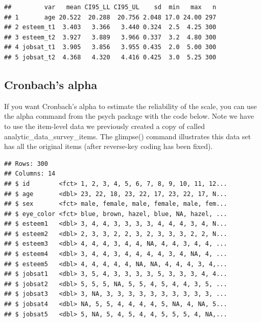 \documentclass[
]{krantz}
\makeatletter
\newenvironment{Shaded}{\begin{snugshade}}{\end{snugshade}}
\newcommand{\KeywordTok}[1]{\textcolor[rgb]{0.27,0.27,0.27}{\textbf{#1}}}
\newcommand{\NormalTok}[1]{#1}
\newcommand{\OperatorTok}[1]{\textcolor[rgb]{0.43,0.43,0.43}{\textbf{#1}}}
\newcommand{\StringTok}[1]{\textcolor[rgb]{0.5,0.5,0.5}{#1}}
\newenvironment{kframe}{%
\medskip{}
\setlength{\fboxsep}{.8em}
 \def\at@end@of@kframe{}%
 \ifinner\ifhmode%
  \def\at@end@of@kframe{\end{minipage}}%
  \begin{minipage}{\columnwidth}%
 \fi\fi%
 \def\FrameCommand##1{\hskip\@totalleftmargin \hskip-\fboxsep
 \colorbox{shadecolor}{##1}\hskip-\fboxsep
     \hskip-\linewidth \hskip-\@totalleftmargin \hskip\columnwidth}%
 \MakeFramed {\advance\hsize-\width
   \@totalleftmargin\z@ \linewidth\hsize
   \@setminipage}}%
 {\par\unskip\endMakeFramed%
 \at@end@of@kframe}
\renewenvironment{Shaded}{\begin{kframe}}{\end{kframe}}
\makeatother
\begin{document}
\begin{verbatim}
##         var   mean CI95_LL CI95_UL    sd  min   max   n
## 1       age 20.522  20.288  20.756 2.048 17.0 24.00 297
## 2 esteem_t1  3.403   3.366   3.440 0.324  2.5  4.25 300
## 3 esteem_t2  3.927   3.889   3.966 0.337  3.2  4.80 300
## 4 jobsat_t1  3.905   3.856   3.955 0.435  2.0  5.00 300
## 5 jobsat_t2  4.368   4.320   4.416 0.425  3.0  5.25 300
\end{verbatim}

\hypertarget{cronbachs-alpha}{%
\subsection{Cronbach's alpha}\label{cronbachs-alpha}}

If you want Cronbach's alpha to estimate the reliability of the scale, you can use the alpha command from the psych package with the code below. Note we have to use the item-level data we previously created a copy of called analytic\_data\_survey\_items. The glimpse() command illustrates this data set has all the original items (after reverse-key coding has been fixed).

\begin{Shaded}
\end{Shaded}

\begin{verbatim}
## Rows: 300
## Columns: 14
## $ id        <fct> 1, 2, 3, 4, 5, 6, 7, 8, 9, 10, 11, 12...
## $ age       <dbl> 23, 22, 18, 23, 22, 17, 23, 22, 17, N...
## $ sex       <fct> male, female, male, female, male, fem...
## $ eye_color <fct> blue, brown, hazel, blue, NA, hazel, ...
## $ esteem1   <dbl> 3, 4, 4, 3, 3, 3, 3, 4, 4, 4, 3, 4, N...
## $ esteem2   <dbl> 2, 3, 3, 2, 2, 3, 2, 3, 3, 3, 2, 2, N...
## $ esteem3   <dbl> 4, 4, 4, 3, 4, 4, NA, 4, 4, 3, 4, 4, ...
## $ esteem4   <dbl> 3, 4, 4, 3, 4, 4, 4, 4, 3, 4, NA, 4, ...
## $ esteem5   <dbl> 4, 4, 4, 4, 4, NA, NA, 4, 4, 4, 3, 4,...
## $ jobsat1   <dbl> 3, 5, 4, 3, 3, 3, 3, 5, 3, 3, 3, 4, 4...
## $ jobsat2   <dbl> 5, 5, 5, NA, 5, 5, 4, 5, 4, 4, 3, 5, ...
## $ jobsat3   <dbl> 3, NA, 3, 3, 3, 3, 3, 3, 3, 3, 3, 3, ...
## $ jobsat4   <dbl> NA, 5, 5, 4, 4, 4, 4, 5, NA, 4, NA, 5...
## $ jobsat5   <dbl> 5, NA, 5, 4, 5, 4, 4, 5, 5, 5, 4, NA,...
\end{verbatim}
\end{document}
